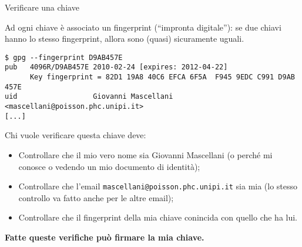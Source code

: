 \documentclass{beamer}
\begin{document}
\begin{frame}[fragile]{Verificare una chiave}

  Ad ogni chiave è associato un fingerprint (``impronta digitale''):
  se due chiavi hanno lo stesso fingerprint, allora sono (quasi)
  sicuramente uguali.

  {\scriptsize
\begin{verbatim}
$ gpg --fingerprint D9AB457E
pub   4096R/D9AB457E 2010-02-24 [expires: 2012-04-22]
      Key fingerprint = 82D1 19A8 40C6 EFCA 6F5A  F945 9EDC C991 D9AB 457E
uid                  Giovanni Mascellani <mascellani@poisson.phc.unipi.it>
[...]
\end{verbatim}}

\pause

Chi vuole verificare questa chiave deve:
\begin{itemize}
\item Controllare che il mio vero nome sia Giovanni Mascellani (o
  perché mi conosce o vedendo un mio documento di identità);
\item Controllare che l'email \verb-mascellani@poisson.phc.unipi.it-
  sia mia (lo stesso controllo va fatto anche per le altre email);
\item Controllare che il fingerprint della mia chiave conincida con
  quello che ha lui.
\end{itemize}

\textbf{Fatte queste verifiche può firmare la mia chiave.}

\end{frame}
\end{document}
